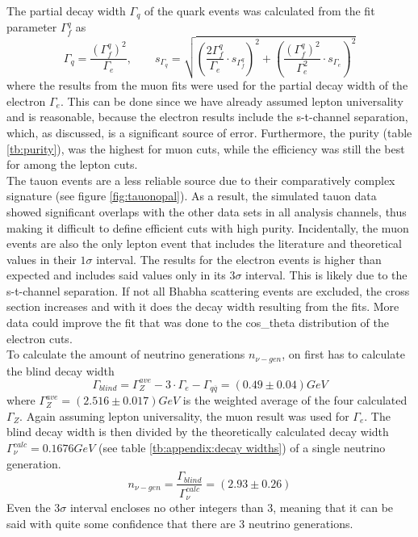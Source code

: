 The partial decay width $\Gamma_q$ of the quark events was calculated from the fit parameter $\Gamma_f^q$ as
\begin{equation}
\Gamma_q=\frac{(\Gamma_{f}^q)^2}{\Gamma_e},\qquad
s_{\Gamma_q}=\sqrt{\left(\frac{2\Gamma_f^q}{\Gamma_e}\cdot s_{\Gamma_f^q}\right)^2+\left(\frac{(\Gamma_f^q)^2}{\Gamma_e^2}\cdot s_{\Gamma_e}\right)^2}
\end{equation}
where the results from the muon fits were used for the partial decay width of the electron $\Gamma_e$. This can be done since we have already assumed lepton universality and is reasonable, because the electron results include the s-t-channel separation, which, as discussed, is a significant source of error. Furthermore, the purity (table \ref{tb:purity}), was the highest for muon cuts, while the efficiency was still the best for among the lepton cuts.\\
The tauon events are a less reliable source due to their comparatively complex signature (see figure \ref{fig:tauonopal}). As a result, the simulated tauon data showed significant overlaps with the other data sets in all analysis channels, thus making it difficult to define efficient cuts with high purity. 
Incidentally, the muon events are also the only lepton event that includes the literature and theoretical values in their $1\sigma$ interval. The results for the electron events is higher than expected and includes said values only in its $3\sigma$ interval. This is likely due to the s-t-channel separation. If not all Bhabha scattering events are excluded, the cross section increases and with it does the decay width resulting from the fits. More data could improve the fit that was done to the cos\_theta distribution of the electron cuts. \\

To calculate the amount of neutrino generations $n_{\nu-gen}$, on first has to calculate the blind decay width
\begin{equation}
	\Gamma_{blind}=\Gamma_{Z}^{ave}-3\cdot\Gamma_e-\Gamma_{q\overline{q}}=\unit{(0.49\pm0.04)}{GeV}
\end{equation}
where $\Gamma_{Z}^{ave}=\unit{(2.516\pm0.017)}{GeV}$ is the weighted average of the four calculated $\Gamma_{Z}$. Again assuming lepton universality, the muon result was used for $\Gamma_e$.
The blind decay width is then divided by the theoretically calculated decay width $\Gamma_{\nu}^{calc}=\unit{0.1676}{GeV}$ (see table \ref{tb:appendix:decay widths}) of a single neutrino generation.
\begin{equation}
	n_{\nu-gen}=\frac{\Gamma_{blind}}{\Gamma_{\nu}^{calc}}=(2.93\pm0.26)
\end{equation}
Even the $3\sigma$ interval encloses no other integers than 3, meaning that it can be said with quite some confidence that there are 3 neutrino generations.


